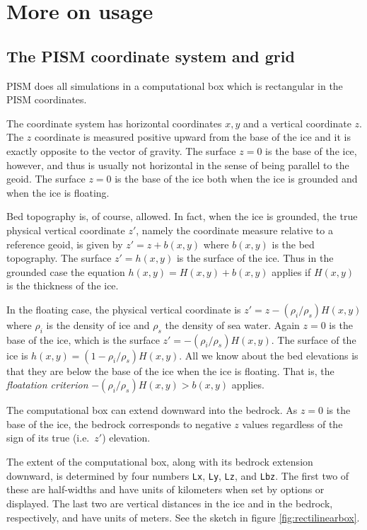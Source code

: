 \documentclass[11pt,final]{amsart}
\renewcommand{\t}[1]{\texttt{#1}}
\begin{document}
\clearpage
\newpage
\section{More on usage}\label{sect:usage}

\subsection{The PISM coordinate system and grid} \label{subsect:coords} PISM does all simulations in a computational box which is rectangular in the PISM coordinates.

The coordinate system has horizontal coordinates $x,y$ and a vertical coordinate $z$.  The $z$ coordinate is measured positive upward from the base of the ice and it is exactly opposite to the vector of gravity.  The surface $z=0$ is the base of the ice, however, and thus is usually not horizontal in the sense of being parallel to the geoid.   The surface $z=0$ is the base of the ice both when the ice is grounded and when the ice is floating.

Bed topography is, of course, allowed.  In fact, when the ice is grounded, the true physical vertical coordinate $z'$, namely the coordinate measure relative to a reference geoid, is given by $z'=z+b(x,y)$ where $b(x,y)$ is the bed topography.  The surface $z'=h(x,y)$ is the surface of the ice.  Thus in the grounded case the equation $h(x,y)=H(x,y)+b(x,y)$ applies if $H(x,y)$ is the thickness of the ice.

In the floating case, the physical vertical coordinate is $z'=z-(\rho_i/\rho_s) H(x,y)$ where $\rho_i$ is the density of ice and $\rho_s$ the density of sea water.  Again $z=0$ is the base of the ice, which is the surface $z' = -(\rho_i/\rho_s) H(x,y)$.  The surface of the ice is $h(x,y) = (1-\rho_i/\rho_s) H(x,y)$.  All we know about the bed elevations is that they are below the base of the ice when the ice is floating.  That is, the \emph{floatation criterion} $-(\rho_i/\rho_s) H(x,y) > b(x,y)$ applies.

The computational box can extend downward into the bedrock.  As $z=0$ is the base of the ice, the bedrock corresponds to negative $z$ values regardless of the sign of its true (i.e.~$z'$) elevation.

The extent of the computational box, along with its bedrock extension downward, is determined by four numbers \t{Lx}, \t{Ly}, \t{Lz}, and \t{Lbz}.  The first two of these are half-widths and have units of kilometers when set by options or displayed.  The last two are vertical distances in the ice and in the bedrock, respectively, and have units of meters.  See the sketch in figure \ref{fig:rectilinearbox}.
\end{document}
